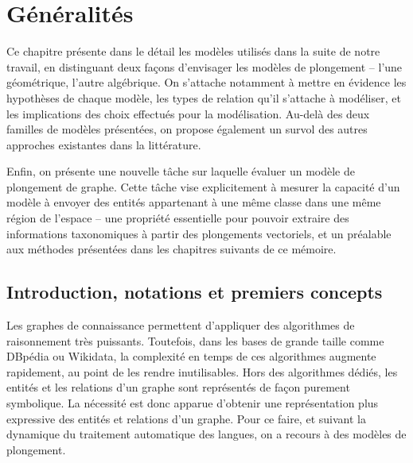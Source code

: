 \label{chap:kge}

\section{Généralités}
\label{sec:kge-general}




Ce chapitre présente dans le détail les modèles utilisés dans la suite de notre travail, en distinguant deux façons d'envisager les modèles de plongement – l'une géométrique, l'autre algébrique. On s'attache notamment à mettre en évidence les hypothèses de chaque modèle, les types de relation qu'il s'attache à modéliser, et les implications des choix effectués pour la modélisation. Au-delà des deux familles de modèles présentées, on propose également un survol des autres approches existantes dans la littérature.

Enfin, on présente une nouvelle tâche sur laquelle évaluer un modèle de plongement de graphe. Cette tâche vise explicitement à mesurer la capacité d'un modèle à envoyer des entités appartenant à une même classe dans une même région de l'espace – une propriété essentielle pour pouvoir extraire des informations taxonomiques à partir des plongements vectoriels, et un préalable aux méthodes présentées dans les chapitres suivants de ce mémoire.

\subsection{Introduction, notations et premiers concepts}
\label{subsec:kge-general-intro}

Les graphes de connaissance permettent d'appliquer des algorithmes de raisonnement très puissants. Toutefois, dans les bases de grande taille comme DBpédia ou Wikidata, la complexité en temps de ces algorithmes augmente rapidement, au point de les rendre inutilisables. Hors des algorithmes dédiés, les entités et les relations d'un graphe sont représentés de façon purement symbolique. La nécessité est donc apparue d'obtenir une représentation plus expressive des entités et relations d'un graphe. Pour ce faire, et suivant la dynamique du traitement automatique des langues, on a recours à des modèles de plongement. 

\newcommand{\URI}{\operatorname{URI}}
\newcommand{\Adja}{\operatorname{Adj}}

